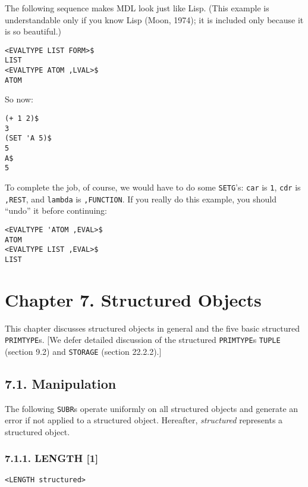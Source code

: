 \documentclass[a4paper,]{article}
\begin{document}
The following sequence makes MDL look just like Lisp. (This example is understandable only if you know Lisp (Moon, 1974);
it is included only because it is so beautiful.)

\begin{verbatim}
<EVALTYPE LIST FORM>$
LIST
<EVALTYPE ATOM ,LVAL>$
ATOM
\end{verbatim}

So now:

\begin{verbatim}
(+ 1 2)$
3
(SET 'A 5)$
5
A$
5
\end{verbatim}

To complete the job, of course, we would have to do some \texttt{SETG}'s: \texttt{car} is \texttt{1}, \texttt{cdr} is
\texttt{,REST}, and \texttt{lambda} is \texttt{,FUNCTION}. If you really do this example, you should ``undo'' it before
continuing:

\begin{verbatim}
<EVALTYPE 'ATOM ,EVAL>$
ATOM
<EVALTYPE LIST ,EVAL>$
LIST
\end{verbatim}

\section{Chapter 7. Structured Objects}\label{chapter-7.-structured-objects}

This chapter discusses structured objects in general and the five basic structured \texttt{PRIMTYPE}s. {[}We defer detailed
discussion of the structured \texttt{PRIMTYPE}s \texttt{TUPLE} (section 9.2) and \texttt{STORAGE} (section 22.2.2).{]}

\subsection{7.1. Manipulation}\label{manipulation}

The following \texttt{SUBR}s operate uniformly on all structured objects and generate an error if not applied to a
structured object. Hereafter, \emph{structured} represents a structured object.

\subsubsection{7.1.1. LENGTH {[}1{]}}\label{length-1}

\begin{verbatim}
<LENGTH structured>
\end{verbatim}
\end{document}
